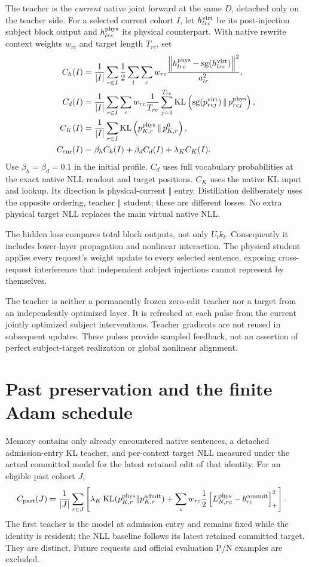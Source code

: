\documentclass[10pt]{article}
\newcommand{\KL}{\operatorname{KL}}
\newcommand{\sg}{\operatorname{sg}}
\newcommand{\norm}[1]{\left\lVert#1\right\rVert}
\newcommand{\pos}[1]{\left[#1\right]_+}
\begin{document}
The teacher is the \emph{current} native joint forward at the same $D$,
detached only on the teacher side. For a selected current cohort $I$,
let $h^{\rm virt}_{lrc}$ be its post-injection subject block output and
$h^{\rm phys}_{lrc}$ its physical counterpart. With native rewrite
context weights $w_{rc}$ and target length $T_{rc}$, set
\begin{align}
 C_h(I)&=\frac1{|I|}\sum_{r\in I}\frac12
 \sum_l\sum_c w_{rc}
 \frac{\norm{h^{\rm phys}_{lrc}-\sg(h^{\rm virt}_{lrc})}^2}{a_{lr}^2},\\
 C_d(I)&=\frac1{|I|}\sum_{r\in I}\sum_c w_{rc}\frac1{T_{rc}}
 \sum_{j=1}^{T_{rc}}
 \KL\left(\sg(p^{\rm virt}_{rcj})\,\Vert\,p^{\rm phys}_{rcj}\right),\\
 C_K(I)&=\frac1{|I|}\sum_{r\in I}
 \KL\left(p^{\rm phys}_{K,r}\,\Vert\,p^0_{K,r}\right),\\
 C_{\rm cur}(I)&=\beta_h C_h(I)+\beta_d C_d(I)+\lambda_K C_K(I).
 \label{eq:currentfeedback}
\end{align}
Use $\beta_h=\beta_d=0.1$ in the initial profile. $C_d$ uses full
vocabulary probabilities at the exact native NLL readout and target
positions. $C_K$ uses the native KL input and lookup. Its direction is
physical-current $\Vert$ entry. Distillation deliberately uses the
opposite ordering, teacher $\Vert$ student; these are different losses.
No extra physical target NLL replaces the main virtual native NLL.

The hidden loss compares total block outputs, not only $U_lk_l$.
Consequently it includes lower-layer propagation and nonlinear
interaction. The physical student applies every request's weight update
to every selected sentence, exposing cross-request interference that
independent subject injections cannot represent by themselves.

The teacher is neither a permanently frozen zero-edit teacher nor a
target from an independently optimized layer. It is refreshed at each
pulse from the current jointly optimized subject interventions. Teacher
gradients are not reused in subsequent updates. These pulses provide
sampled feedback, not an assertion of perfect subject-target realization
or global nonlinear alignment.

\newpage
\section{Past preservation and the finite Adam schedule}
Memory contains only already encountered native sentences, a detached
admission-entry KL teacher, and per-context target NLL measured under the
actual committed model for the latest retained edit of that identity.
For an eligible past cohort $J$,
\begin{align}
 C_{\rm past}(J)
 &=\frac1{|J|}\sum_{r\in J}\left[
 \lambda_K\KL(p^{\rm phys}_{K,r}\Vert p^{\rm admit}_{K,r})
 +\sum_c w_{rc}\frac12\pos{L^{\rm phys}_{N,rc}-b^{\rm commit}_{rc}}^2
 \right]. \label{eq:past}
\end{align}
The first teacher is the model at admission entry and remains fixed
while the identity is resident; the NLL baseline follows its latest
retained committed target. They are distinct.
Future requests and official evaluation P/N examples are excluded.
\end{document}
